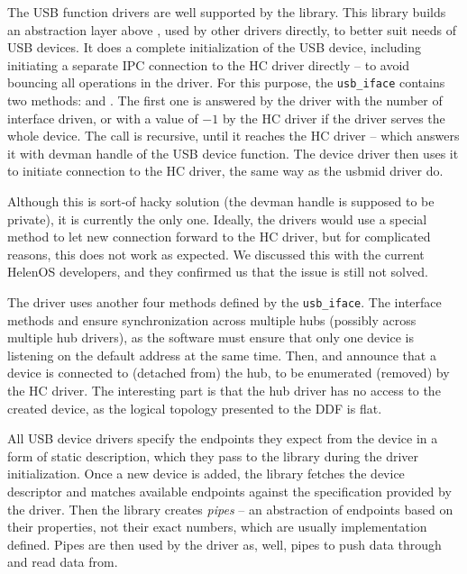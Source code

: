 The USB function drivers are well supported by the  library.
This library builds an abstraction layer above , used by other
drivers directly, to better suit needs of USB devices. It does a complete
initialization of the USB device, including initiating a separate IPC
connection to the HC driver directly -- to avoid bouncing all operations in the
 driver. For this purpose, the \texttt{usb\_iface} contains two
methods:  and . The first one is
answered by the  driver with the number of interface driven, or
with a value of $-1$ by the HC driver if the driver serves the whole device.
The  call is recursive, until it reaches the HC
driver -- which answers it with devman handle of the USB device function. The
device driver then uses it to initiate connection to the HC driver, the same
way as the usbmid driver do.

Although this is sort-of hacky solution (the devman handle is supposed to be
private), it is currently the only one. Ideally, the drivers would use
a special method to let new connection forward to the HC driver, but for
complicated reasons, this does not work as expected. We discussed this with the
current HelenOS developers, and they confirmed us that the issue is still not
solved.

The  driver uses another four methods defined by the
\texttt{usb\_iface}. The interface methods  and
 ensure synchronization across multiple hubs
(possibly across multiple hub drivers), as the software must ensure that only one
device is listening on the default address at the same time. Then,
 and  announce that a device is
connected to (detached from) the hub, to be enumerated (removed) by the HC
driver. The interesting part is that the hub driver has no access to the
created device, as the logical topology presented to the DDF is flat.

All USB device drivers specify the endpoints they expect from the device in
a form of static description, which they pass to the  library
during the driver initialization. Once a new device is added, the library
fetches the device descriptor and matches available endpoints against the
specification provided by the driver. Then the library creates \emph{pipes} --
an abstraction of endpoints based on their properties, not their exact numbers,
which are usually implementation defined. Pipes are then used by the driver
as, well, pipes to push data through and read data from.

